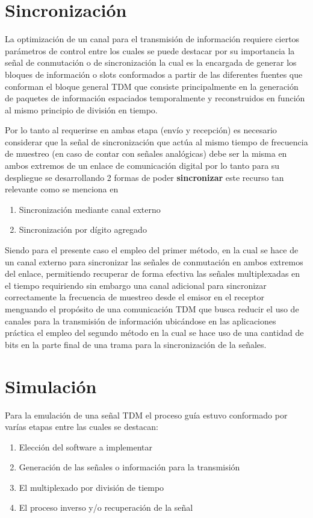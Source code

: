 \documentclass[conference]{IEEEtran}
\begin{document}
	\section{\textbf{Sincronización}}
	
	La optimización de un canal para el transmisión de información requiere ciertos parámetros de control entre los cuales se puede destacar por su importancia la señal de conmutación o de sincronización la cual es la encargada de generar los bloques de información o slots conformados a partir de las diferentes fuentes que conforman el bloque general TDM que consiste principalmente en la generación de paquetes de información espaciados temporalmente y reconstruidos en función al mismo principio de división en tiempo.
	
	Por lo tanto al requerirse en ambas etapa (envío y recepción) es necesario considerar que la señal de sincronización que actúa al mismo tiempo de frecuencia de muestreo (en caso de contar con señales analógicas) debe ser la misma en ambos extremos de un enlace de comunicación digital por lo tanto para su despliegue se desarrollando 2 formas de poder \textbf{sincronizar} este recurso tan relevante como se menciona en \cite{couch2012sistemas}
	
	\begin{enumerate}
		\item Sincronización mediante canal externo
		\item Sincronización por dígito agregado
	\end{enumerate}
	
	Siendo para el presente caso el empleo del primer método, en la cual se hace de un canal externo para sincronizar las señales de conmutación en ambos extremos del enlace, permitiendo recuperar de forma efectiva las señales multiplexadas en el tiempo requiriendo sin embargo una canal adicional para sincronizar correctamente la frecuencia de muestreo desde el emisor en el receptor menguando el propósito de una comunicación TDM que busca reducir el uso de canales para la transmisión de información ubicándose en las aplicaciones práctica el empleo del segundo método en la cual se hace uso de una cantidad de bits en la parte final de una trama para la sincronización de la señales.
	
	\section{\textbf{Simulación}}
	
	Para la emulación de una señal TDM el proceso guía estuvo conformado por varías etapas entre las cuales se destacan:
	\begin{enumerate}
		\item Elección del software a implementar
		\item Generación de las señales o información para la transmisión
		\item El multiplexado por división de tiempo
		\item El proceso inverso y/o recuperación de la señal
	\end{enumerate}
		
\end{document}
